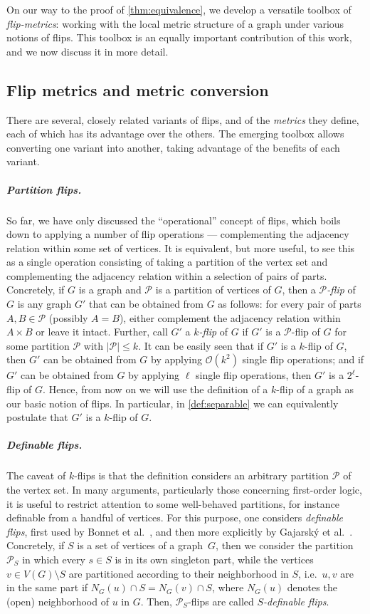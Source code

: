 \documentclass[a4paper,UKenglish,cleveref, autoref, thm-restate]{lipics-v2021}
\renewcommand{\cal}{\mathcal}
\newcommand{\PP}{\mathcal{P}}
\renewcommand{\le}{\leqslant}
\renewcommand{\leq}{\le}
\newcommand{\Oh}{\mathcal{O}}
\begin{document}
On our way to the proof of \cref{thm:equivalence}, we develop a versatile toolbox of {\em{flip-metrics}}: working with the local metric structure of a graph under various notions of flips.
This toolbox is an equally important contribution of this work, and we now discuss it in more detail.






\subsection*{Flip metrics and metric conversion}
There are several, closely related variants of flips, and of the \emph{metrics} they define, each of which has its advantage over the others. The emerging toolbox  allows converting one variant into another, taking advantage of the benefits of each variant.

\subparagraph*{Partition flips.} So far, we have only discussed the ``operational'' concept of flips, which boils down to applying a number of flip operations --- complementing the adjacency relation within some set of vertices. It is equivalent, but more useful, to see this as a single operation consisting of taking a partition of the vertex set and complementing the adjacency relation within a selection of pairs of parts. Concretely, if $G$ is a graph and $\cal P$ is a partition of vertices of $G$, then a {\em{$\cal P$-flip}} of $G$ is any graph $G'$ that can be obtained from $G$ as follows: for every pair of parts $A,B\in \cal P$ (possibly $A=B$), either complement the adjacency relation within $A\times B$ or leave it intact. Further, call $G'$ a {\em{$k$-flip}} of $G$ if $G'$ is a $\cal P$-flip of $G$ for some partition $\cal P$ with $|\cal P|\leq k$. It can be easily seen that if $G'$ is a $k$-flip of $G$, then $G'$ can be obtained from $G$ by applying $\Oh(k^2)$ single flip operations; and if $G'$ can be obtained from $G$ by applying $\ell$ single flip operations, then $G'$ is a $2^\ell$-flip of $G$. Hence, from now on we will use the definition of a $k$-flip of a graph as our basic notion of flips. In particular, in \cref{def:separable} we can equivalently postulate that $G'$ is a $k$-flip of $G$.

\subparagraph*{Definable flips.} The caveat of $k$-flips is that the definition considers an arbitrary partition $\cal P$ of the vertex set. In many arguments, particularly those concerning first-order logic, it is useful to restrict attention to some well-behaved partitions, for instance definable from a handful of vertices. For this purpose, one considers {\em{definable flips}}, first used by Bonnet et al.~\cite{boundedLocalCliquewidth}, and then more explicitly by Gajarsk\'y et al.~\cite{flipper-game}. 
Concretely, if $S$ is a set of vertices of a graph~$G$, then we consider the partition $\cal P_S$ in which every $s\in S$ is in its own singleton part, while the vertices $v\in V(G)\setminus S$ are partitioned according to their neighborhood in $S$, i.e.~$u,v$ are in the same part if $N_G(u) \cap S = N_G(v) \cap S$, where $N_G(u)$ denotes the (open) neighborhood of $u$ in $G$. Then, $\PP_S$-flips are called \emph{$S$-definable flips}.
\end{document}
